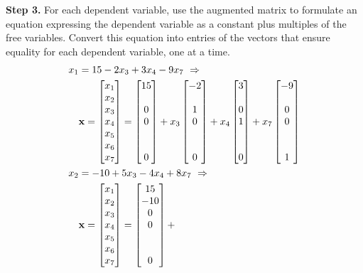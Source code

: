 \documentclass{ximera}
\begin{document}
\begin{example}
  \textbf{Step 3.}  For each dependent variable, use the augmented
  matrix to formulate an equation expressing the dependent variable as
  a constant plus multiples of the free variables.  Convert this
  equation into entries of the vectors that ensure equality for each
  dependent variable, one at a time.
  \begin{align*}
    x_1&=15-2x_3+3x_4-9x_7\ \Rightarrow\\&\vect{x}=
                                           \colvector{x_1\\x_2\\x_3\\x_4\\x_5\\x_6\\x_7}=
    \colvector{15\\ \\ 0\\ 0\\ \\ \\ 0}+
    x_3\colvector{-2\\ \\ 1\\ 0\\ \\ \\ 0}+
    x_4\colvector{3\\ \\ 0\\ 1\\ \\ \\ 0}+
    x_7\colvector{-9\\ \\ 0\\ 0\\ \\ \\ 1}\\
    x_2&=-10+5x_3-4x_4+8x_7\ \Rightarrow\\&\vect{x}=
                                            \colvector{x_1\\x_2\\x_3\\x_4\\x_5\\x_6\\x_7}=
    \colvector{15\\ -10\\ 0\\ 0\\ \\ \\ 0}+

\end{align*}
\end{example}
\end{document}
